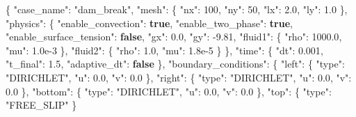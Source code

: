\documentclass[
  french,
]{article}
\newenvironment{Shaded}{}{}
\newcommand{\DataTypeTok}[1]{\textcolor[rgb]{0.56,0.13,0.00}{#1}}
\newcommand{\DecValTok}[1]{\textcolor[rgb]{0.25,0.63,0.44}{#1}}
\newcommand{\FloatTok}[1]{\textcolor[rgb]{0.25,0.63,0.44}{#1}}
\newcommand{\FunctionTok}[1]{\textcolor[rgb]{0.02,0.16,0.49}{#1}}
\newcommand{\KeywordTok}[1]{\textcolor[rgb]{0.00,0.44,0.13}{\textbf{#1}}}
\newcommand{\StringTok}[1]{\textcolor[rgb]{0.25,0.44,0.63}{#1}}
\begin{document}
\begin{Shaded}
\begin{Highlighting}[]
\FunctionTok{\{}
  \DataTypeTok{"case\_name"}\FunctionTok{:} \StringTok{"dam\_break"}\FunctionTok{,}
  \DataTypeTok{"mesh"}\FunctionTok{:} \FunctionTok{\{} \DataTypeTok{"nx"}\FunctionTok{:} \DecValTok{100}\FunctionTok{,} \DataTypeTok{"ny"}\FunctionTok{:} \DecValTok{50}\FunctionTok{,} \DataTypeTok{"lx"}\FunctionTok{:} \FloatTok{2.0}\FunctionTok{,} \DataTypeTok{"ly"}\FunctionTok{:} \FloatTok{1.0} \FunctionTok{\},}
  \DataTypeTok{"physics"}\FunctionTok{:} \FunctionTok{\{}
    \DataTypeTok{"enable\_convection"}\FunctionTok{:} \KeywordTok{true}\FunctionTok{,}
    \DataTypeTok{"enable\_two\_phase"}\FunctionTok{:} \KeywordTok{true}\FunctionTok{,}
    \DataTypeTok{"enable\_surface\_tension"}\FunctionTok{:} \KeywordTok{false}\FunctionTok{,}
    \DataTypeTok{"gx"}\FunctionTok{:} \FloatTok{0.0}\FunctionTok{,} \DataTypeTok{"gy"}\FunctionTok{:} \FloatTok{{-}9.81}\FunctionTok{,}
    \DataTypeTok{"fluid1"}\FunctionTok{:} \FunctionTok{\{} \DataTypeTok{"rho"}\FunctionTok{:} \FloatTok{1000.0}\FunctionTok{,} \DataTypeTok{"mu"}\FunctionTok{:} \FloatTok{1.0e{-}3} \FunctionTok{\},}
    \DataTypeTok{"fluid2"}\FunctionTok{:} \FunctionTok{\{} \DataTypeTok{"rho"}\FunctionTok{:} \FloatTok{1.0}\FunctionTok{,}    \DataTypeTok{"mu"}\FunctionTok{:} \FloatTok{1.8e{-}5} \FunctionTok{\}}
  \FunctionTok{\},}
  \DataTypeTok{"time"}\FunctionTok{:} \FunctionTok{\{} \DataTypeTok{"dt"}\FunctionTok{:} \FloatTok{0.001}\FunctionTok{,} \DataTypeTok{"t\_final"}\FunctionTok{:} \FloatTok{1.5}\FunctionTok{,} \DataTypeTok{"adaptive\_dt"}\FunctionTok{:} \KeywordTok{false} \FunctionTok{\},}
  \DataTypeTok{"boundary\_conditions"}\FunctionTok{:} \FunctionTok{\{}
    \DataTypeTok{"left"}\FunctionTok{:}   \FunctionTok{\{} \DataTypeTok{"type"}\FunctionTok{:} \StringTok{"DIRICHLET"}\FunctionTok{,} \DataTypeTok{"u"}\FunctionTok{:} \FloatTok{0.0}\FunctionTok{,} \DataTypeTok{"v"}\FunctionTok{:} \FloatTok{0.0} \FunctionTok{\},}
    \DataTypeTok{"right"}\FunctionTok{:}  \FunctionTok{\{} \DataTypeTok{"type"}\FunctionTok{:} \StringTok{"DIRICHLET"}\FunctionTok{,} \DataTypeTok{"u"}\FunctionTok{:} \FloatTok{0.0}\FunctionTok{,} \DataTypeTok{"v"}\FunctionTok{:} \FloatTok{0.0} \FunctionTok{\},}
    \DataTypeTok{"bottom"}\FunctionTok{:} \FunctionTok{\{} \DataTypeTok{"type"}\FunctionTok{:} \StringTok{"DIRICHLET"}\FunctionTok{,} \DataTypeTok{"u"}\FunctionTok{:} \FloatTok{0.0}\FunctionTok{,} \DataTypeTok{"v"}\FunctionTok{:} \FloatTok{0.0} \FunctionTok{\},}
    \DataTypeTok{"top"}\FunctionTok{:}    \FunctionTok{\{} \DataTypeTok{"type"}\FunctionTok{:} \StringTok{"FREE\_SLIP"} \FunctionTok{\}}

\end{Highlighting}
\end{Shaded}
\end{document}
